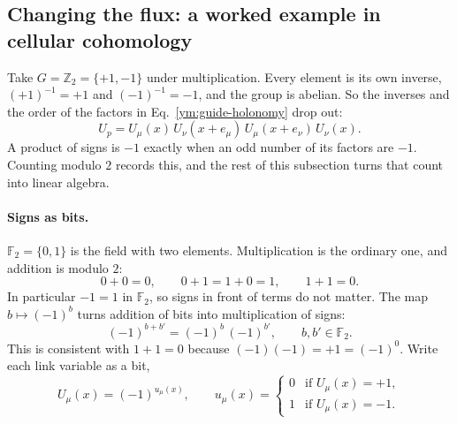 \subsection{Changing the flux: a worked example in cellular cohomology}
Take $G=\mathbb Z_2=\{+1,-1\}$ under multiplication. Every element is its
own inverse, $(+1)^{-1}=+1$ and $(-1)^{-1}=-1$, and the group is abelian.
So the inverses and the order of the factors in
Eq.~\eqref{ym:guide-holonomy} drop out:
\begin{equation}\label{ym:guide-z2-holonomy}
 U_p=U_\mu(x)\,U_\nu(x+e_\mu)\,U_\mu(x+e_\nu)\,U_\nu(x).
\end{equation}
A product of signs is $-1$ exactly when an odd number of its factors are
$-1$. Counting modulo $2$ records this, and the rest of this subsection
turns that count into linear algebra.

\paragraph{Signs as bits.}
$\mathbb F_2=\{0,1\}$ is the field with two elements. Multiplication is the
ordinary one, and addition is modulo $2$:
\begin{equation}\label{ym:guide-F2}
 0+0=0,\qquad 0+1=1+0=1,\qquad 1+1=0.
\end{equation}
In particular $-1=1$ in $\mathbb F_2$, so signs in front of terms do not
matter. The map $b\mapsto(-1)^b$ turns addition of bits into
multiplication of signs:
\begin{equation}\label{ym:guide-bits-signs}
 (-1)^{b+b'}=(-1)^b\,(-1)^{b'},\qquad b,b'\in\mathbb F_2 .
\end{equation}
This is consistent with $1+1=0$ because $(-1)(-1)=+1=(-1)^0$. Write each
link variable as a bit,
\begin{equation}\label{ym:guide-link-bit}
 U_\mu(x)=(-1)^{u_\mu(x)},\qquad
 u_\mu(x)=\begin{cases}0&\text{if }U_\mu(x)=+1,\\
 1&\text{if }U_\mu(x)=-1.\end{cases}
\end{equation}

